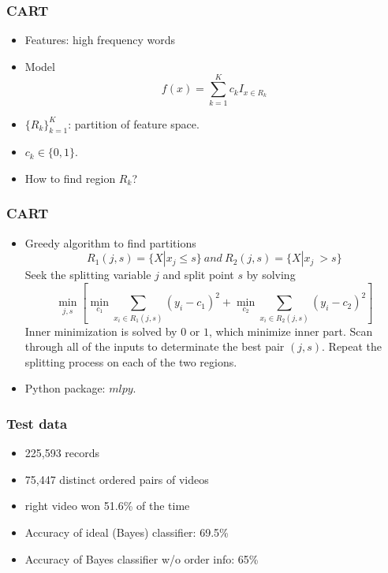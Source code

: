 \documentclass[fleqn]{beamer}
\begin{document}
\begin{frame}
\frametitle{CART}
    \begin{itemize}
     \item Features: high frequency words
     \item Model
     $$f(x) = \sum_{k=1}^K c_k I_{x \in R_k}$$
     \item $\{R_k\}_{k=1}^K$: partition of feature space. 
     \item $c_k \in \{0, 1\}$.
     \item How to find region $R_k$?
    \end{itemize}
\end{frame}
\begin{frame}
\frametitle{CART}
  \begin{itemize}
   \item Greedy algorithm to find partitions
   $$R_1(j, s) = \{X|x_j \leq s\}\ and\ R_2(j, s) = \{X|x_j \ > s\}$$
   Seek the splitting variable $j$ and split point $s$ by solving
   $$\min_{j,s} [\min_{c_1} \sum_{x_i \in R_1(j, s)} (y_i - c_1)^2 + \min_{c_2} 
   \sum_{x_i \in R_2(j, s)} (y_i - c_2)^2]$$
   Inner minimization is solved by $0$ or $1$, which minimize inner part. 
   Scan through all of the inputs to determinate the best pair $(j, s)$. 
   Repeat the splitting process on each of the two regions.
  \item Python package: $mlpy$.
  \end{itemize}

\end{frame}

\begin{frame}
\frametitle{Test data}
    \begin{itemize}
        \item 225,593 records
        \item 75,447 distinct ordered pairs of videos
        \item right video won 51.6\% of the time
        \item Accuracy of ideal (Bayes) classifier: 69.5\% 
        \item Accuracy of Bayes classifier w/o order info: 65\%
    \end{itemize}

\end{frame}
\end{document}
